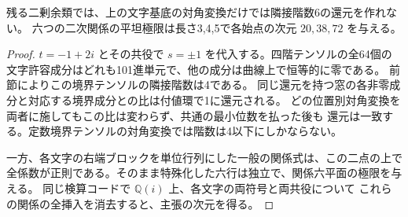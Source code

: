 \begin{proposition}
残る二剰余類では、上の文字基底の対角変換だけでは隣接階数6の還元を作れない。
六つの二次関係の平坦極限は長さ3,4,5で各始点の次元 $20,38,72$ を与える。
\end{proposition}
\begin{proof}
$t=-1+2i$ とその共役で $s=\pm1$ を代入する。四階テンソルの全64個の
文字許容成分はどれも101進単元で、他の成分は曲線上で恒等的に零である。
前節によりこの境界テンソルの隣接階数は4である。
同じ還元を持つ窓の各非零成分と対応する境界成分との比は付値環で1に還元される。
どの位置別対角変換を両者に施してもこの比は変わらず、共通の最小位数を払った後も
還元は一致する。定数境界テンソルの対角変換では階数は4以下にしかならない。

一方、各文字の右端ブロックを単位行列にした一般の関係式は、この二点の上で
全係数が正則である。そのまま特殊化した六行は独立で、関係六平面の極限を与える。
同じ検算コードで $\mathbb Q(i)$ 上、各文字の両符号と両共役について
これらの関係の全挿入を消去すると、主張の次元を得る。
\end{proof}
